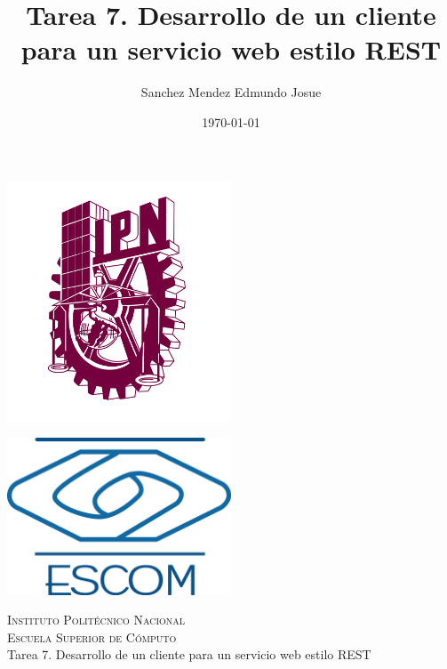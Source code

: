 \documentclass[11pt]{article}
\date{\today}
\title{Tarea 7. Desarrollo de un cliente para un servicio web estilo REST}
\author{Sanchez Mendez Edmundo Josue}
\begin{document}
		\begin{titlepage}
			\begin{center}
				
				
				\noindent
				\begin{minipage}{0.5\textwidth}
					\begin{flushleft} \large
						\includegraphics[width=0.5\textwidth]{resources/ipn.png}
					\end{flushleft}
				\end{minipage}%
				\begin{minipage}{0.55\textwidth}
					\begin{flushright} \large
						\includegraphics[width=0.5\textwidth]{resources/escom.png}
					\end{flushright}
				\end{minipage}
				
				\textsc{\LARGE Instituto Politécnico Nacional}\\[0.5cm]
				
				\textsc{\Large Escuela Superior de Cómputo}\\[1cm]
				
				
				{ \huge Tarea 7. Desarrollo de un cliente para un servicio web estilo REST \\[1cm] }
				

\end{center}
\end{titlepage}
\end{document}
